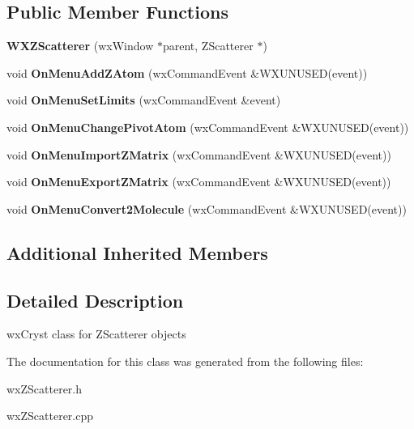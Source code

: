 \subsection*{Public Member Functions}
\begin{DoxyCompactItemize}
\item 
\mbox{\label{class_obj_cryst_1_1_w_x_z_scatterer_a31bc4d836fd15777ed05bcad6de0bf10}} 
{\bfseries W\+X\+Z\+Scatterer} (wx\+Window $\ast$parent, Z\+Scatterer $\ast$)
\item 
\mbox{\label{class_obj_cryst_1_1_w_x_z_scatterer_a833bd6904f5fd6f4b9f55e0ec0913d68}} 
void {\bfseries On\+Menu\+Add\+Z\+Atom} (wx\+Command\+Event \&W\+X\+U\+N\+U\+S\+ED(event))
\item 
\mbox{\label{class_obj_cryst_1_1_w_x_z_scatterer_ab2d3abcead0647cce625f56e54707c79}} 
void {\bfseries On\+Menu\+Set\+Limits} (wx\+Command\+Event \&event)
\item 
\mbox{\label{class_obj_cryst_1_1_w_x_z_scatterer_a5f95e101225b58cc017fdeae754de065}} 
void {\bfseries On\+Menu\+Change\+Pivot\+Atom} (wx\+Command\+Event \&W\+X\+U\+N\+U\+S\+ED(event))
\item 
\mbox{\label{class_obj_cryst_1_1_w_x_z_scatterer_ae5e0aa58d6af68a0f429020275d4be00}} 
void {\bfseries On\+Menu\+Import\+Z\+Matrix} (wx\+Command\+Event \&W\+X\+U\+N\+U\+S\+ED(event))
\item 
\mbox{\label{class_obj_cryst_1_1_w_x_z_scatterer_a7b4b1f359ce9f0072b9dc3b9e8dc3861}} 
void {\bfseries On\+Menu\+Export\+Z\+Matrix} (wx\+Command\+Event \&W\+X\+U\+N\+U\+S\+ED(event))
\item 
\mbox{\label{class_obj_cryst_1_1_w_x_z_scatterer_a99d3177d4efb43fc834bf01e16f408e6}} 
void {\bfseries On\+Menu\+Convert2\+Molecule} (wx\+Command\+Event \&W\+X\+U\+N\+U\+S\+ED(event))
\end{DoxyCompactItemize}
\subsection*{Additional Inherited Members}


\subsection{Detailed Description}
wx\+Cryst class for Z\+Scatterer objects 

The documentation for this class was generated from the following files\+:\begin{DoxyCompactItemize}
\item 
wx\+Z\+Scatterer.\+h\item 
wx\+Z\+Scatterer.\+cpp\end{DoxyCompactItemize}
